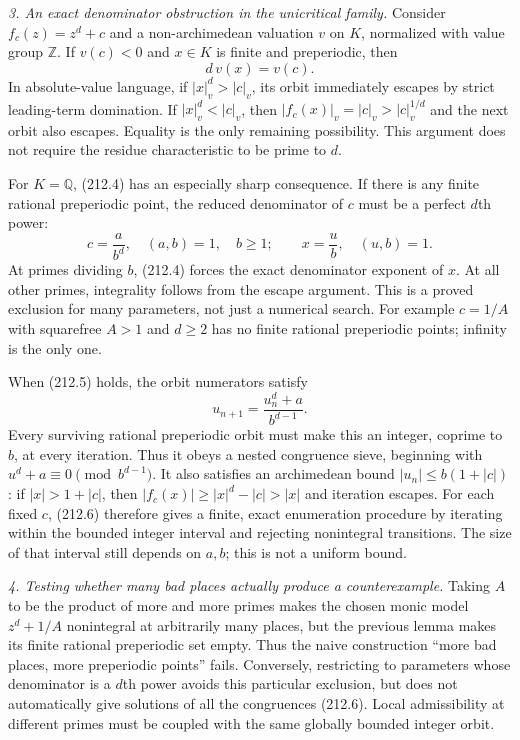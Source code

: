 \documentclass[11pt,a4paper]{article}
\newcommand{\Z}{\mathbb{Z}}
\newcommand{\Q}{\mathbb{Q}}
\begin{document}
\textit{3. An exact denominator obstruction in the unicritical family.}
Consider $f_c(z)=z^d+c$ and a non-archimedean valuation $v$ on $K$, normalized
with value group $\Z$. If $v(c)<0$ and $x\in K$ is finite and preperiodic,
then
\[
 d\,v(x)=v(c).                                                \tag{212.4}
\]
In absolute-value language, if $|x|_v^d>|c|_v$, its orbit immediately escapes
by strict leading-term domination. If $|x|_v^d<|c|_v$, then
$|f_c(x)|_v=|c|_v>|c|_v^{1/d}$ and the next orbit also escapes. Equality is
the only remaining possibility. This argument does not require the residue
characteristic to be prime to $d$.

For $K=\Q$, (212.4) has an especially sharp consequence. If there is any
finite rational preperiodic point, the reduced denominator of $c$ must be
a perfect $d$th power:
\[
 c=\frac{a}{b^d},\quad (a,b)=1,\quad b\ge1;
 \qquad x=\frac{u}{b},\quad (u,b)=1.                           \tag{212.5}
\]
At primes dividing $b$, (212.4) forces the exact denominator exponent of
$x$. At all other primes, integrality follows from the escape argument.
This is a proved exclusion for many parameters, not just a numerical search.
For example $c=1/A$ with squarefree $A>1$ and $d\ge2$ has no finite rational
preperiodic points; infinity is the only one.

When (212.5) holds, the orbit numerators satisfy
\[
 u_{n+1}=\frac{u_n^d+a}{b^{d-1}}.                              \tag{212.6}
\]
Every surviving rational preperiodic orbit must make this an integer,
coprime to $b$, at every iteration. Thus it obeys a nested congruence sieve,
beginning with $u^d+a\equiv0\pmod{b^{d-1}}$. It also satisfies an archimedean
bound $|u_n|\le b(1+|c|)$: if $|x|>1+|c|$, then
$|f_c(x)|\ge |x|^d-|c|>|x|$ and iteration escapes. For each fixed $c$,
(212.6) therefore gives a finite, exact enumeration procedure by iterating
within the bounded integer interval and rejecting nonintegral transitions.
The size of that interval still depends on $a,b$; this is not a uniform
bound.

\textit{4. Testing whether many bad places actually produce a counterexample.}
Taking $A$ to be the product of more and more primes makes the chosen monic
model $z^d+1/A$ nonintegral at arbitrarily many places, but the previous
lemma makes its finite rational preperiodic set empty. Thus the naive
construction ``more bad places, more preperiodic points'' fails. Conversely,
restricting to parameters whose denominator is a $d$th power avoids this
particular exclusion, but does not automatically give solutions of all the
congruences (212.6). Local admissibility at different primes must be coupled
with the same globally bounded integer orbit.
\end{document}
